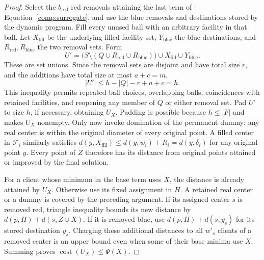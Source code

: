\begin{proof}
Select the $b_{\mathrm{red}}$ red removals attaining the last term of
Equation~\eqref{comp:surrogate}, and use the blue removals and destinations
stored by the dynamic program.  Fill every unused ball with an arbitrary
facility in that ball.  Let $X_{\mathrm{fill}}$ be the underlying filled
facility set, $Y_{\mathrm{blue}}$ the blue destinations, and
$R_{\mathrm{red}},R_{\mathrm{blue}}$ the two removal sets.  Form
\[
 U'=\bigl(S\setminus(Q\cup R_{\mathrm{red}}\cup R_{\mathrm{blue}})\bigr)
          \cup X_{\mathrm{fill}}\cup Y_{\mathrm{blue}}.
\]
These are set unions.  Since the removal sets are disjoint and have
total size $r$, and the additions have total size at most $a+c=m$,
\begin{equation}
 |U'|\le h-|Q|-r+a+c=h.
 \label{comp:cardinality}
\end{equation}
This inequality permits repeated ball choices, overlapping balls,
coincidences with retained facilities, and reopening any member of $Q$
or either removal set.  Pad $U'$ to size $h$, if necessary, obtaining
$U_X$.  Padding is possible because $h\le|F|$ and makes $U_X$ nonempty.
Only now invoke domination of the permanent dummy: any real center is
within the original diameter of every original point.  A filled center
in $\mathcal F_i$ similarly satisfies
$d(y,X_{\mathrm{fill}})\le d(y,w_i)+R_i=d(y,\delta_i)$ for any original
point $y$.  Every point of $Z$ therefore has its distance from original
points attained or improved by the final solution.

For a client whose minimum in the base term uses $X$, the distance is
already attained by $U_X$.  Otherwise use its fixed assignment in $H$.
A retained real center or a dummy is covered by the preceding argument.
If its assigned center $s$ is removed red, triangle inequality bounds
its new distance by $d(p,H)+d(s,Z\cup X)$.  If it is removed blue, use
$d(p,H)+d(s,y_s)$ for its stored destination $y_s$.  Charging these
additional distances to all $w'_s$ clients of a removed center is an
upper bound even when some of their base minima use $X$.  Summing proves
$\operatorname{cost}(U_X)\le\Psi(X)$.


\end{proof}
